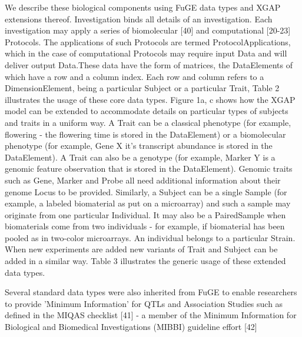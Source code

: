 We describe these biological components using FuGE data types and XGAP extensions thereof. 
Investigation binds all details of an investigation. Each investigation may apply a series 
of biomolecular [40] and computational [20-23] Protocols. The applications of such Protocols 
are termed ProtocolApplications, which in the case of computational Protocols may require 
input Data and will deliver output Data.These data have the form of matrices, the DataElements 
of which have a row and a column index. Each row and column refers to a DimensionElement, 
being a particular Subject or a particular Trait, Table 2 illustrates the usage of these core 
data types. Figure 1a, c shows how the XGAP model can be extended to accommodate details on 
particular types of subjects and traits in a uniform way. A Trait can be a classical phenotype 
(for example, flowering - the flowering time is stored in the DataElement) or a biomolecular 
phenotype (for example, Gene X it's transcript abundance is stored in the DataElement). A 
Trait can also be a genotype (for example, Marker Y is a genomic feature observation that is 
stored in the DataElement). Genomic traits such as Gene, Marker and Probe all need additional 
information about their genome Locus to be provided. Similarly, a Subject can be a single 
Sample (for example, a labeled biomaterial as put on a microarray) and such a sample may 
originate from one particular Individual. It may also be a PairedSample when biomaterials come 
from two individuals - for example, if biomaterial has been pooled as in two-color microarrays. 
An individual belongs to a particular Strain. When new experiments are added new variants of 
Trait and Subject can be added in a similar way. Table 3 illustrates the generic usage of 
these extended data types.

Several standard data types were also inherited from FuGE to enable researchers to provide 
'Minimum Information' for QTLs and Association Studies such as defined in the MIQAS checklist 
[41] - a member of the Minimum Information for Biological and Biomedical Investigations (MIBBI) 
guideline effort [42]


